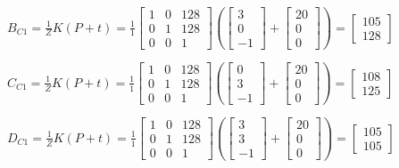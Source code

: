 \documentclass[12pt, letterpaper]{article}
\begin{document}
\vspace{0.4cm}
\indent $ B_{C1} = \frac{1}{Z}K(P+t) = \frac{1}{1}\begin{bmatrix}  1&0&128 \\ 0&1&128 \\ 0&0&1  \end{bmatrix} (\begin{bmatrix} 3\\0\\-1 \end{bmatrix}+\begin{bmatrix} 20\\0\\0 \end{bmatrix}
) = \begin{bmatrix} 105\\128 \end{bmatrix} $

\vspace{0.4cm}
\indent $ C_{C1} = \frac{1}{Z}K(P+t) = \frac{1}{1}\begin{bmatrix}  1&0&128 \\ 0&1&128 \\ 0&0&1  \end{bmatrix} (\begin{bmatrix} 0\\3\\-1 \end{bmatrix} + \begin{bmatrix} 20\\0\\0 \end{bmatrix}
)  = \begin{bmatrix} 108\\125 \end{bmatrix} $

\vspace{0.4cm}
\indent $ D_{C1} = \frac{1}{Z}K(P+t) = \frac{1}{1}\begin{bmatrix}  1&0&128 \\ 0&1&128 \\ 0&0&1  \end{bmatrix} ( \begin{bmatrix} 3\\3\\-1 \end{bmatrix} + \begin{bmatrix} 20\\0\\0 \end{bmatrix}
 ) = \begin{bmatrix} 105\\105 \end{bmatrix} $
\end{document}
